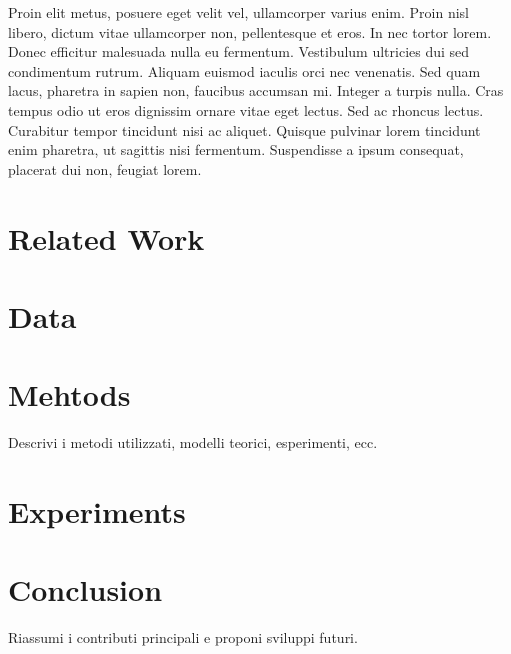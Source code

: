 \documentclass[10pt,twocolumn]{article}
\begin{document}
	Proin elit metus, posuere eget velit vel, ullamcorper varius enim. Proin nisl libero, dictum vitae ullamcorper non, pellentesque et eros. In nec tortor lorem. Donec efficitur malesuada nulla eu fermentum. Vestibulum ultricies dui sed condimentum rutrum. Aliquam euismod iaculis orci nec venenatis. Sed quam lacus, pharetra in sapien non, faucibus accumsan mi. Integer a turpis nulla. Cras tempus odio ut eros dignissim ornare vitae eget lectus. Sed ac rhoncus lectus. Curabitur tempor tincidunt nisi ac aliquet. Quisque pulvinar lorem tincidunt enim pharetra, ut sagittis nisi fermentum. Suspendisse a ipsum consequat, placerat dui non, feugiat lorem.
	
	\section{Related Work}
	\section{Data}
	\section{Mehtods}
	Descrivi i metodi utilizzati, modelli teorici, esperimenti, ecc.
	\section{Experiments}
	
	\section{Conclusion}
	Riassumi i contributi principali e proponi sviluppi futuri.
	
	
	
\end{document}
